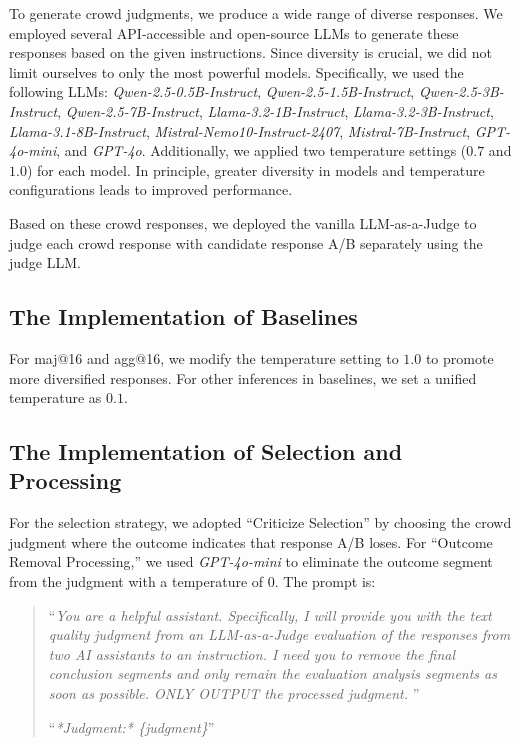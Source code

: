 To generate crowd judgments, we produce a wide range of diverse responses. We employed several API-accessible and open-source LLMs to generate these responses based on the given instructions. Since diversity is crucial, we did not limit ourselves to only the most powerful models. Specifically, we used the following LLMs: \textit{Qwen-2.5-0.5B-Instruct}, \textit{Qwen-2.5-1.5B-Instruct}, \textit{Qwen-2.5-3B-Instruct}, \textit{Qwen-2.5-7B-Instruct}, \textit{Llama-3.2-1B-Instruct}, \textit{Llama-3.2-3B-Instruct}, \textit{Llama-3.1-8B-Instruct}, \textit{Mistral-Nemo10-Instruct-2407}, \textit{Mistral-7B-Instruct}, \textit{GPT-4o-mini}, and \textit{GPT-4o}. Additionally, we applied two temperature settings ($0.7$ and $1.0$) for each model. In principle, greater diversity in models and temperature configurations leads to improved performance.


Based on these crowd responses, we deployed the vanilla LLM-as-a-Judge to judge each crowd response with candidate response A/B separately using the judge LLM. 

\subsection{The Implementation of Baselines}
\label{subsec:implemenatation_baseline}

For maj@16 and agg@16, we modify the temperature setting to $1.0$ to promote more diversified responses. For other inferences in baselines, we set a unified temperature as $0.1$.


\subsection{The Implementation of Selection and Processing}
\label{subsec:implementation_selection}

For the selection strategy, we adopted ``Criticize Selection'' by choosing the crowd judgment where the outcome indicates that response A/B loses. For ``Outcome Removal Processing,'' we used \textit{GPT-4o-mini} to eliminate the outcome segment from the judgment with a temperature of $0$. The prompt is: 
\begin{quote}
``\textit{You are a helpful assistant. Specifically, I will provide you with the text quality judgment from an LLM-as-a-Judge evaluation of the responses from two AI assistants to an instruction. I need you to remove the final conclusion segments and only remain the evaluation analysis segments as soon as possible. ONLY OUTPUT the processed judgment.} ''

``\textit{*Judgment:* \{judgment\}}''
\end{quote}


